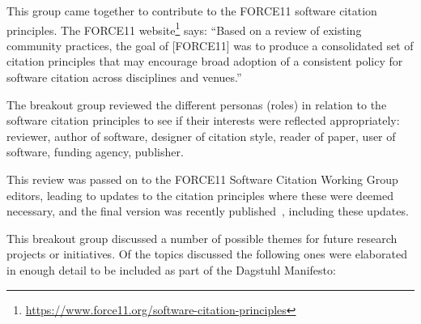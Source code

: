 \documentclass[a4paper,UKenglish]{dagrep}
\begin{document}

This group came together to contribute to the FORCE11 software citation principles. The FORCE11 website\footnote{\url{https://www.force11.org/software-citation-principles}} says: ``Based on a review of existing community practices, the goal of [FORCE11] was to produce a consolidated set of citation principles that may encourage broad adoption of a consistent policy for software citation across disciplines and venues.''

The breakout group reviewed the different personas (roles) in relation to the software citation principles to see if their interests were reflected appropriately:
reviewer, author of software, designer of citation style, reader of paper, user of software, funding agency, publisher.

This review was passed on to the FORCE11 Software Citation Working Group editors, leading to updates to the citation principles where these were deemed necessary, and the final version was recently published~\cite{10.7717/peerj-cs.86}, including these updates.



This breakout group discussed a number of possible themes for future research projects or initiatives.
Of the topics discussed the following ones were elaborated in enough detail to be included as part of the Dagstuhl Manifesto:
\end{document}
